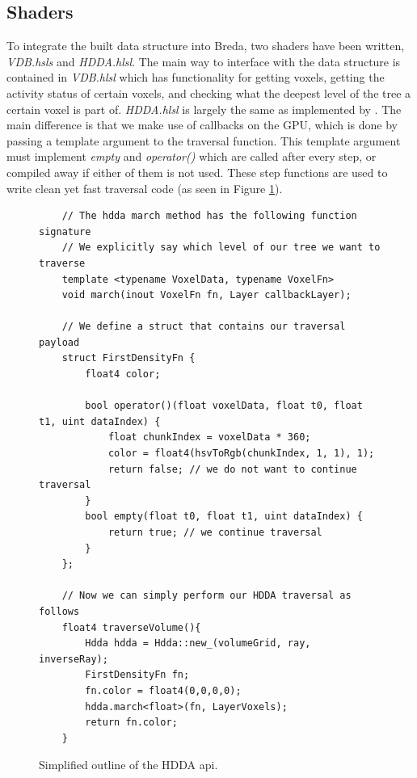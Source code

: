\subsection{Shaders} \label{implementation:shaders}
To integrate the built data structure into Breda, two shaders have been written, \textit{VDB.hsls} and \textit{HDDA.hlsl}. The main way to interface with the data structure is contained in \textit{VDB.hlsl} which has functionality for getting voxels, getting the activity status of certain voxels, and checking what the deepest level of the tree a certain voxel is part of. \textit{HDDA.hlsl} is largely the same as implemented by \cite{museth2013vdb}. The main difference is that we make use of callbacks on the GPU, which is done by passing a template argument to the traversal function. This template argument must implement \textit{empty} and \textit{operator()} which are called after every step, or compiled away if either of them is not used. These step functions are used to write clean yet fast traversal code (as seen in Figure \ref{implementation:hdda_sample}).


\begin{figure}
    \begin{lstlisting}
    // The hdda march method has the following function signature
    // We explicitly say which level of our tree we want to traverse
    template <typename VoxelData, typename VoxelFn>
    void march(inout VoxelFn fn, Layer callbackLayer);

    // We define a struct that contains our traversal payload
    struct FirstDensityFn {
        float4 color;
    
        bool operator()(float voxelData, float t0, float t1, uint dataIndex) {
            float chunkIndex = voxelData * 360;
            color = float4(hsvToRgb(chunkIndex, 1, 1), 1);
            return false; // we do not want to continue traversal
        }
        bool empty(float t0, float t1, uint dataIndex) { 
            return true; // we continue traversal
        }
    };

    // Now we can simply perform our HDDA traversal as follows
    float4 traverseVolume(){
        Hdda hdda = Hdda::new_(volumeGrid, ray, inverseRay);
        FirstDensityFn fn;
        fn.color = float4(0,0,0,0);
        hdda.march<float>(fn, LayerVoxels); 
        return fn.color;
    }
\end{lstlisting}
    \caption{Simplified outline of the HDDA api.}\label{implementation:hdda_sample}
\end{figure}


